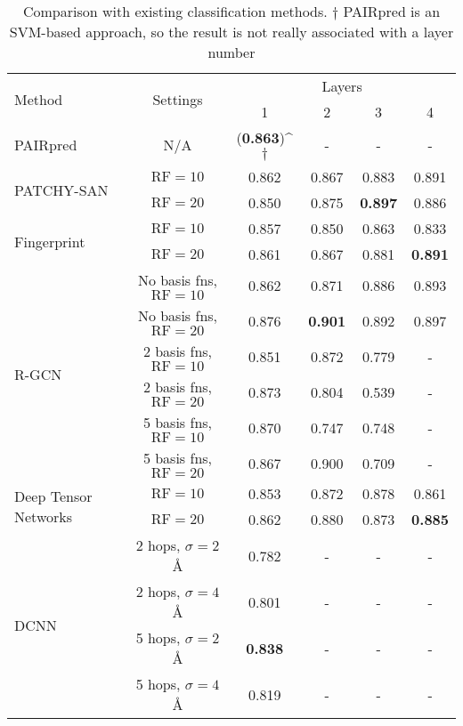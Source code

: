 \begin{table}
	\begin{center}
		\begin{tabular}{l c c c c c }
			\toprule
			
			\multirow{2}{*}{Method} & \multirow{2}{*}{Settings} &  \multicolumn{4}{c}{Layers} \\
											 & & 1 & 2 & 3 & 4 \\
			\midrule
			PAIRpred~\cite{minhas2014}   & N/A  & (\textbf{0.863})^{$\dagger$} & - & - & - \\

			\midrule
			\multirow{2}{*}{PATCHY-SAN~\cite{niepert2016}}  & $\text{RF}=10$ & 0.862 & 0.867 & 0.883 & 0.891 \\
										 & $\text{RF}=20$ & 0.850 & 0.875 & \textbf{0.897} & 0.886 \\
			\midrule
			\multirow{2}{*}{Fingerprint~\cite{duvenaud2015}}  & $\text{RF}=10$ & 0.857 & 0.850 & 0.863 & 0.833 \\
										  & $\text{RF}=20$ & 0.861 & 0.867 & 0.881 & \textbf{0.891} \\
			\midrule

			\multirow{6}{*}{R-GCN~\cite{schlichtkrull2017}} & No basis fns, $\text{RF}=10$ & 0.862 & 0.871 & 0.886 & 0.893 \\
								   & No basis fns, $\text{RF}=20$ & 0.876 & \textbf{0.901} & 0.892 & 0.897 \\
								   & 2 basis fns, $\text{RF}=10$ & 0.851 & 0.872 & 0.779 & -	   \\
								   & 2 basis fns, $\text{RF}=20$ & 0.873 & 0.804 & 0.539 & -     \\
								   & 5 basis fns, $\text{RF}=10$ & 0.870 & 0.747 & 0.748 & -	   \\
								   & 5 basis fns, $\text{RF}=20$ & 0.867 & 0.900 & 0.709 & -     \\
			\midrule
			\multirow{2}{*}{Deep Tensor Networks~\cite{schutt2017}}& $\text{RF}=10$ & 0.853 & 0.872 & 0.878 & 0.861 \\
			& $\text{RF}=20$ & 0.862 & 0.880 & 0.873 & \textbf{0.885} \\
			\midrule
			\multirow{4}{*}{DCNN~\cite{atwood2016}} & 2 hops, $\sigma=2$\AA{} & 0.782 & - & - & - \\
										& 2 hops, $\sigma=4$\AA{} & 0.801 & - & - & - \\
										& 5 hops, $\sigma=2$\AA{} & \textbf{0.838} & - & - & - \\ 
										& 5 hops, $\sigma=4$\AA{} & 0.819 & - & - & - \\ 
												  
			\bottomrule
			
		\end{tabular}
		\caption{Comparison with existing classification methods. $\dagger$ PAIRpred is an SVM-based approach, so the result is not really associated with a layer number}
		\label{tab:results_compare}
	\end{center}
\end{table}

